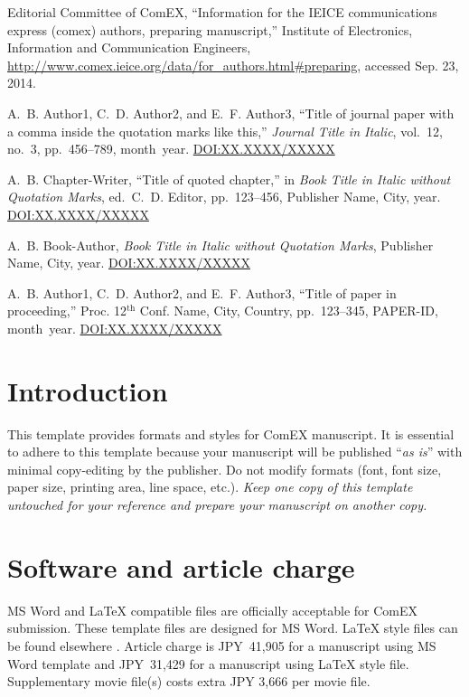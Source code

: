\documentclass{comex}
\begin{document}
\begin{thebibliography}{1} \providecommand{\urlstyle}[1]{} \urlstyle{rm}

{Editorial Committee of ComEX}, ``Information for the {IEICE} communications
  express (comex) authors, preparing manuscript,'' Institute of Electronics,
  Information and Communication Engineers,
  \url{http://www.comex.ieice.org/data/for_authors.html#preparing}, accessed
  Sep. 23, 2014.

A.~B. Author1, C.~D. Author2, and E.~F. Author3, ``Title of journal paper with
  a comma inside the quotation marks like this,'' {\em Journal Title in
  Italic}, vol.~12, no.~3, pp.~456--789, month\ year.
\newblock \url{DOI:XX.XXXX/XXXXX}

A.~B. Chapter-Writer, ``Title of quoted chapter,'' in {\it Book Title in Italic
  without Quotation Marks}, ed.~C.~D. Editor, pp.~123--456, Publisher Name,
  City, year.
\newblock \url{DOI:XX.XXXX/XXXXX}

A.~B. Book-Author, {\em Book Title in Italic without Quotation Marks},
  Publisher Name, City, year.
\newblock \url{DOI:XX.XXXX/XXXXX}

A.~B. Author1, C.~D. Author2, and E.~F. Author3, ``Title of paper in
  proceeding,'' Proc. 12$^{\mathrm{th}}$ Conf. Name, City, Country,
  pp.~123--345, PAPER-ID, month\ year.
\newblock \url{DOI:XX.XXXX/XXXXX}

\end{thebibliography}


\section{Introduction}

This template provides formats and styles for ComEX manuscript. It is
essential to adhere to this template because your manuscript will be
published ``{\it as is}'' with minimal copy-editing by the publisher. Do
not modify formats (font, font size, paper size, printing area, line
space, etc.).  {\it Keep one copy of this template untouched for your
reference and prepare your manuscript on another copy.}

\section{Software and article charge}

MS Word and \LaTeX{} compatible files are officially acceptable for
ComEX submission. These template files are designed for MS Word. \LaTeX{}
style files can be found elsewhere \cite{web_link}.  
Article charge is JPY~41,905 for a manuscript 
using MS Word template and JPY~31,429
for a manuscript using \LaTeX{} style file. 
Supplementary movie file(s) costs extra JPY 3,666 per movie file.
\end{document}
